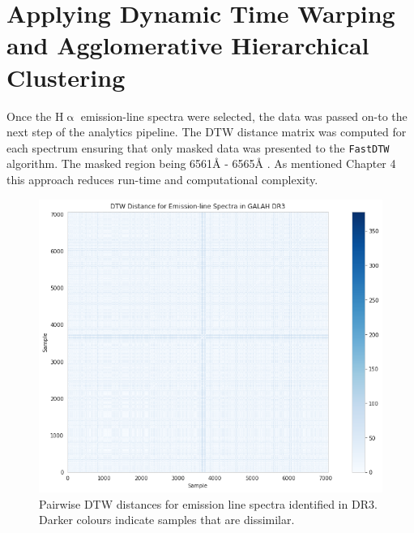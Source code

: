 \section{Applying Dynamic Time Warping and Agglomerative Hierarchical Clustering}

Once the H$\upalpha$ emission-line spectra were selected, the data was passed on-to the next step of the analytics pipeline. The DTW distance matrix was computed for each spectrum ensuring that only masked data was presented to the \texttt{FastDTW} algorithm. The masked region being 6561\r{A} - 6565\r{A} \cite{traven2017galah}. As mentioned Chapter 4 this approach reduces run-time and computational complexity. 

\begin{figure}[!htb]
\centering
\includegraphics[scale=0.50]{figures/dtw distances dr3.png}
\caption{Pairwise DTW distances for emission line spectra identified in DR3. Darker colours indicate samples that are dissimilar.}
\end{figure}

